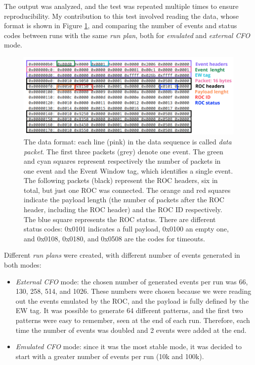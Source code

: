 The output was analyzed, and the test was repeated multiple times to ensure reproducibility. 
My contribution to this test involved reading the data, whose format is shown in Figure \ref{fig:dataformat}, 
and comparing the number of events and status codes between runs with the same \textit{run plan}, 
both for \textit{emulated} and \textit{external CFO} mode. 
\begin{figure}[!h]
  \centering
  \includegraphics[width=\textwidth]{figures/png/Screenshot_20240628_104216.png}
  \caption[The data format.]{The data format: each line (pink) in the data sequence is called \textit{data packet}. 
  The first three packets (grey) denote one event. The green and cyan squares represent respectively
  the number of packets in one event and the Event Window tag, which identifies a single event. 
  The following packets (black) represent the ROC headers, six in total, but just one ROC was connected. 
  The orange and red squares indicate the payload length (the number of packets after 
  the ROC header, including the ROC header) and the ROC ID respectively. The blue square represents 
  the ROC status. There are different status codes: 0x0101 indicates a full payload, 0x0100 an empty one, 
  and 0x0108, 0x0180, and 0x0508 are the codes for timeouts.}
  \label{fig:dataformat}
\end{figure}
Different \textit{run plans} were created, with different number of events generated in both modes:
\begin{itemize}
  \item \textit{External CFO} mode: the chosen number of generated 
  events per run was 66, 130, 258, 514, and 1026. These numbers 
  were chosen because we were reading out the events emulated by 
  the ROC, and the payload is fully defined by the EW tag. 
  It was possible to generate 64 different patterns, and the 
  first two patterns were easy to remember, seen at the end of each run. 
  Therefore, each time the number of events was doubled and 2 events were added at the end.
  \item \textit{Emulated CFO} mode: since it was the most stable mode, 
  it was decided to start with a greater number of events per run (10k and 100k).
\end{itemize}


